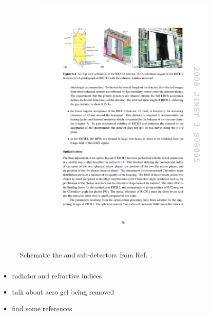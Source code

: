\begin{figure}[!h]
\begin{subfigure}[t]{0.4\textwidth}
        \includegraphics[width=1.0\textwidth]{figs/Detector/richtwo_layout.pdf}
        \caption{\richtwo}
    \end{subfigure}
    \caption{Schematic the \richone and \richtwo sub-detectors from Ref.~\cite{Alves:2008zz}.}

    \label{fig:Dec_rich_layout}   
\end{figure}

\subsubsection{\richone}

{\color{Red}
\begin{itemize}
\item radiator and refractive indices 
\item talk about aero gel being removed
\item find some references 
\end{itemize}
}

